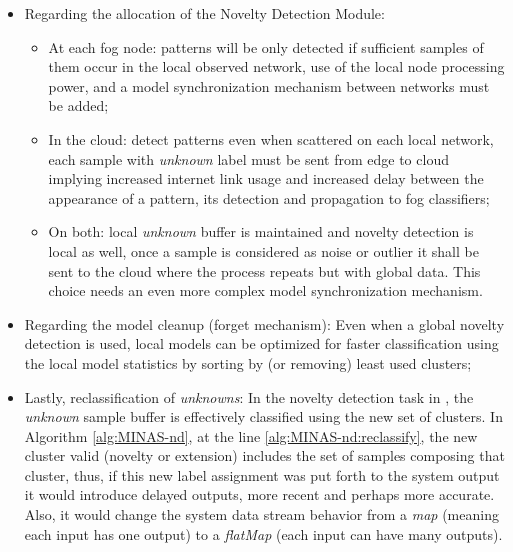 \begin{itemize}
  \item Regarding the allocation of the Novelty Detection Module:
  \begin{itemize}
    
    \item At each fog node: patterns will be only detected if sufficient samples
    of them occur in the local observed network, use of the local node
    processing power, and a model synchronization mechanism between networks
    must be added;

    \item In the cloud: detect patterns even when scattered on each local
    network, each sample with \emph{unknown} label must be sent from edge to
    cloud implying increased internet link usage and increased delay between the
    appearance of a pattern, its detection and propagation to fog classifiers;

    \item On both: local \emph{unknown} buffer is maintained and novelty
    detection is local as well, once a sample is considered as noise or outlier
    it shall be sent to the cloud where the process repeats but with global
    data.
    This choice needs an even more complex model synchronization mechanism.

  \end{itemize}
    
  \item Regarding the model cleanup (forget mechanism): Even when a global
  novelty detection is used, local models can be optimized for faster
  classification using the local model statistics by sorting by (or removing)
  least used clusters;

  \item Lastly, reclassification of \emph{unknowns}: In the novelty detection
  task in \minas, the \emph{unknown} sample buffer is effectively classified
  using the new set of clusters.
  In Algorithm \ref{alg:MINAS-nd}, at the line \ref{alg:MINAS-nd:reclassify}, the
  new cluster valid (novelty or extension) includes the set of samples composing
  that cluster, thus, if this new label assignment was put forth to the system
  output it would introduce delayed outputs, more recent and perhaps more
  accurate.
  Also, it would change the system data stream behavior from a \emph{map}
  (meaning each input has one output) to a \emph{flatMap} (each input can have
  many outputs).

\end{itemize}


